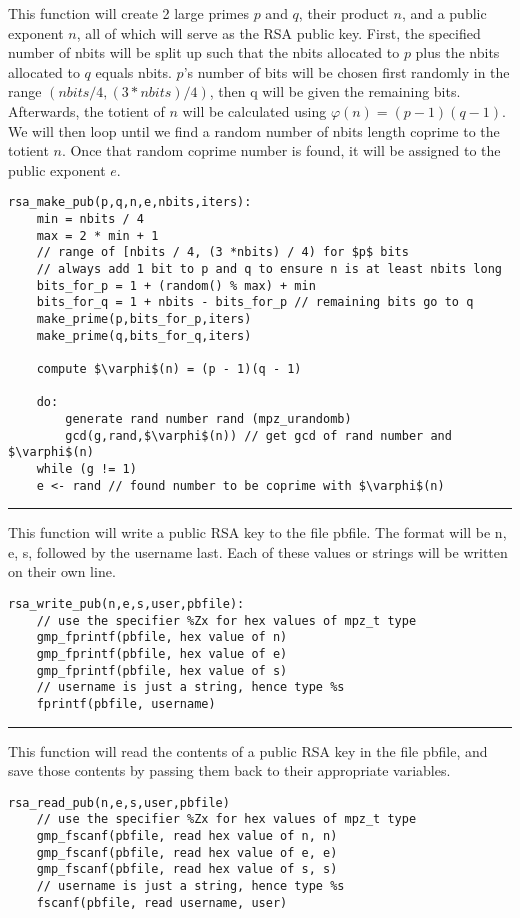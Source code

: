 \documentclass[
	12pt, %
]{fphw}
\begin{document}
This function will create 2 large primes $p$ and $q$, their product $n$, and a public exponent $n$, all of which will serve as the RSA public key. First, the specified number of nbits will be split up such that the nbits allocated to $p$ plus the nbits allocated to $q$ equals nbits. $p$'s number of bits will be chosen first randomly in the range $(nbits / 4, (3 * nbits) / 4)$, then q will be given the remaining bits. \\
Afterwards, the totient of $n$ will be calculated using $\varphi(n) = (p - 1)(q - 1)$. We will then loop until we find a random number of nbits length coprime to the totient $n$. Once that random coprime number is found, it will be assigned to the public exponent $e$.
\begin{lstlisting}[mathescape=true]
rsa_make_pub(p,q,n,e,nbits,iters):
	min = nbits / 4
	max = 2 * min + 1
	// range of [nbits / 4, (3 *nbits) / 4) for $p$ bits
	// always add 1 bit to p and q to ensure n is at least nbits long
	bits_for_p = 1 + (random() % max) + min
	bits_for_q = 1 + nbits - bits_for_p // remaining bits go to q
	make_prime(p,bits_for_p,iters)
	make_prime(q,bits_for_q,iters)
	
	compute $\varphi$(n) = (p - 1)(q - 1)
	
	do:
		generate rand number rand (mpz_urandomb)
		gcd(g,rand,$\varphi$(n)) // get gcd of rand number and $\varphi$(n)
	while (g != 1)
	e <- rand // found number to be coprime with $\varphi$(n)
\end{lstlisting}

\noindent\rule{6.3in}{0.4pt}

This function will write a public RSA key to the file pbfile. The format will be n, e, s, followed by the username last. Each of these values or strings will be written on their own line.
\begin{lstlisting}[mathescape=true]
rsa_write_pub(n,e,s,user,pbfile):
	// use the specifier %Zx for hex values of mpz_t type
	gmp_fprintf(pbfile, hex value of n)
	gmp_fprintf(pbfile, hex value of e)
	gmp_fprintf(pbfile, hex value of s)
	// username is just a string, hence type %s
	fprintf(pbfile, username)
\end{lstlisting}

\noindent\rule{6.3in}{0.4pt}

This function will read the contents of a public RSA key in the file pbfile, and save those contents by passing them back to their appropriate variables.
\begin{lstlisting}[mathescape=true]
rsa_read_pub(n,e,s,user,pbfile)
	// use the specifier %Zx for hex values of mpz_t type
	gmp_fscanf(pbfile, read hex value of n, n)
	gmp_fscanf(pbfile, read hex value of e, e)
	gmp_fscanf(pbfile, read hex value of s, s)
	// username is just a string, hence type %s
	fscanf(pbfile, read username, user)
\end{lstlisting}
\end{document}
